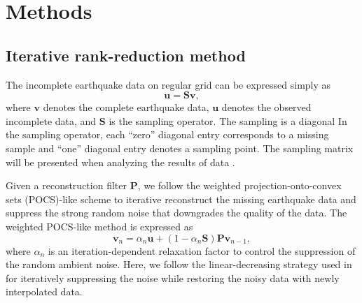 \section*{Methods}
\subsection*{Iterative rank-reduction method} The incomplete earthquake data on  regular grid can be expressed simply as
\begin{equation}
\label{eq:dsamp}
\mathbf{u}=\mathbf{S}\mathbf{v},
\end{equation}
where $\mathbf{v}$ denotes the complete earthquake data, $\mathbf{u}$ denotes the observed incomplete data, and $\mathbf{S}$ is the sampling operator.  The sampling  is a diagonal   In the sampling operator, each ``zero'' diagonal entry corresponds to a missing sample and ``one'' diagonal entry denotes a sampling point. The sampling matrix will be presented when analyzing the results of data . 

Given a reconstruction filter $\mathbf{P}$, we follow the weighted projection-onto-convex sets (POCS)-like scheme to iterative reconstruct the missing earthquake data and suppress the strong random noise that downgrades the quality of the data. The weighted POCS-like method is expressed as
\begin{equation}
\label{eq:wpocs}
\mathbf{v}_n  = \alpha_n\mathbf{u} + (1-\alpha_n\mathbf{S}) \mathbf{P} \mathbf{v}_{n-1},
\end{equation}
where $\alpha_n$ is an iteration-dependent relaxation factor to control the suppression of the random ambient noise. Here, we follow the linear-decreasing strategy used in  \cite[]{yangkang2016irr5d} for iteratively suppressing the noise while restoring the noisy data with newly interpolated data. 

